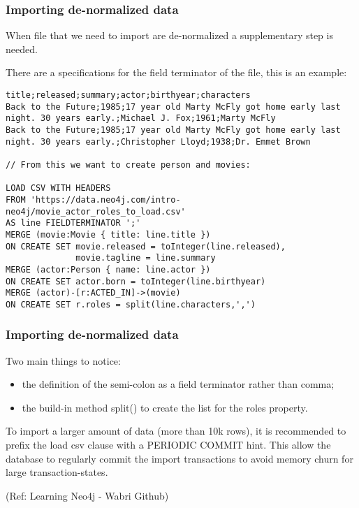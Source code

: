 \begin{frame}[fragile]\frametitle{Importing de-normalized data}
When file that we need to import are de-normalized a supplementary step is needed.


There are a specifications for the field terminator of the file, this is an example:

\begin{lstlisting}
title;released;summary;actor;birthyear;characters
Back to the Future;1985;17 year old Marty McFly got home early last night. 30 years early.;Michael J. Fox;1961;Marty McFly
Back to the Future;1985;17 year old Marty McFly got home early last night. 30 years early.;Christopher Lloyd;1938;Dr. Emmet Brown

// From this we want to create person and movies:

LOAD CSV WITH HEADERS
FROM 'https://data.neo4j.com/intro-neo4j/movie_actor_roles_to_load.csv'
AS line FIELDTERMINATOR ';'
MERGE (movie:Movie { title: line.title })
ON CREATE SET movie.released = toInteger(line.released),
              movie.tagline = line.summary
MERGE (actor:Person { name: line.actor })
ON CREATE SET actor.born = toInteger(line.birthyear)
MERGE (actor)-[r:ACTED_IN]->(movie)
ON CREATE SET r.roles = split(line.characters,',')
\end{lstlisting}


\end{frame}

\begin{frame}[fragile]\frametitle{Importing de-normalized data}

Two main things to notice:

\begin{itemize}
\item the definition of the semi-colon as a field terminator rather than comma;
\item the build-in method split() to create the list for the roles property.
\end{itemize}

To import a larger amount of data (more than 10k rows), it is recommended to prefix the load csv clause with a PERIODIC COMMIT hint. This allow the database to regularly commit the import transactions to avoid memory churn for large transaction-states.

{\tiny (Ref: Learning Neo4j - Wabri Github)}

\end{frame}


